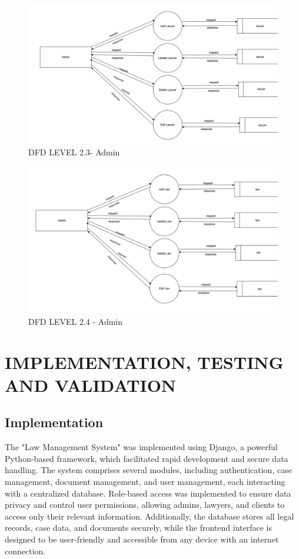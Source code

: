\begin{figure}
  \centering
  \includegraphics[width=0.8\linewidth]{Admin2.3lawyer.png}
 \caption{DFD LEVEL 2.3- Admin}
   \label{fig:DFD LEVEL 2.3 - Admin}
\end{figure}

\begin{figure}
  \centering
  \includegraphics[width=0.8\linewidth]{Admin2.4law.png}
 \caption{DFD LEVEL 2.4 - Admin}
   \label{fig:DFD LEVEL 2.4 - Admin}
\end{figure}
%
\chapter{IMPLEMENTATION, TESTING AND VALIDATION}
%
\section{Implementation}

The "Law Management System" was implemented using Django, a powerful Python-based framework, which facilitated rapid development and secure data handling. The system comprises several modules, including authentication, case management, document management, and user management, each interacting with a centralized database. Role-based access was implemented to ensure data privacy and control user permissions, allowing admins, lawyers, and clients to access only their relevant information. Additionally, the database stores all legal records, case data, and documents securely, while the frontend interface is designed to be user-friendly and accessible from any device with an internet connection.

